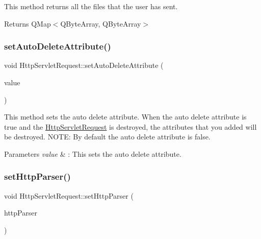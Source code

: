 This method returns all the files that the user has sent. 

\begin{DoxyReturn}{Returns}
Q\+Map$<$\+Q\+Byte\+Array, Q\+Byte\+Array$>$ 
\end{DoxyReturn}
\mbox{\label{class_http_servlet_request_a4e58953a673eb24cd67120ecc7f61e93}} 
\subsubsection{\texorpdfstring{set\+Auto\+Delete\+Attribute()}{setAutoDeleteAttribute()}}
{\footnotesize\ttfamily void Http\+Servlet\+Request\+::set\+Auto\+Delete\+Attribute (\begin{DoxyParamCaption}\item[{bool}]{value }\end{DoxyParamCaption})}



This method sets the auto delete attribute. When the auto delete attribute is true and the \mbox{\hyperlink{class_http_servlet_request}{Http\+Servlet\+Request}} is destroyed, the attributes that you added will be destroyed. N\+O\+TE\+: By default the auto delete attribute is false. 


\begin{DoxyParams}{Parameters}
{\em value} & \+: This sets the auto delete attribute. \\
\hline
\end{DoxyParams}
\mbox{\label{class_http_servlet_request_ab7bf2b4dc9f9335ce747e9dc2221e018}} 
\subsubsection{\texorpdfstring{set\+Http\+Parser()}{setHttpParser()}}
{\footnotesize\ttfamily void Http\+Servlet\+Request\+::set\+Http\+Parser (\begin{DoxyParamCaption}\item[{\mbox{\hyperlink{class_http_parser}{Http\+Parser}} \&}]{http\+Parser }\end{DoxyParamCaption})}



